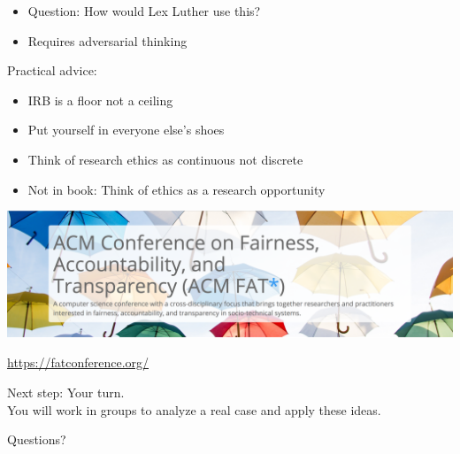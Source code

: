 \documentclass{beamer}
\def\vf{\vfill}
\begin{document}
\begin{frame}

\begin{itemize}
\item Question: How would Lex Luther use this?
\item Requires adversarial thinking
\end{itemize}

\end{frame}
\begin{frame}

Practical advice:
\begin{itemize}
\item IRB is a floor not a ceiling
\pause
\item Put yourself in everyone else's shoes
\pause
\item Think of research ethics as continuous not discrete
\pause
\item Not in book: Think of ethics as a research opportunity
\end{itemize}

\end{frame}
\begin{frame}

\begin{center}
\includegraphics[width=\textwidth]{figures/fat_star}
\end{center}

\vf
\url{https://fatconference.org/}
\end{frame}
\begin{frame}

Next step: Your turn.\\
You will work in groups to analyze a real case and apply these ideas. 

\end{frame}
\begin{frame}

\begin{center}
\LARGE
Questions?
\end{center}

\end{frame}
\end{document}
